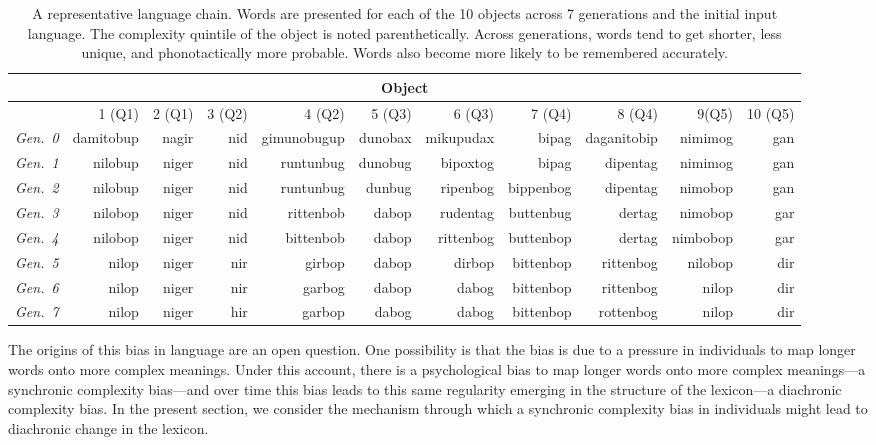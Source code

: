 \begin{table}[t]
 \scriptsize
\centering
\begin{tabular}{c rrrrrrrrrr}
\hline
 \multicolumn{11}{c}{Object} \\
 \hline

 \rule{0pt}{2ex}    
& 1 (Q1) & 2 (Q1) & 3 (Q2) & 4 (Q2) & 5 (Q3) & 6 (Q3) & 7 (Q4) & 8 (Q4) & 9(Q5) & 10 (Q5) \\ 
 \hline
    {\it Gen.\ 0} & damitobup & nagir & nid & gimunobugup & dunobax & mikupudax & bipag & daganitobip & nimimog & gan \\ 
   {\it Gen.\ 1}& nilobup & niger & nid & runtunbug & dunobug & bipoxtog & bipag & dipentag & nimimog & gan \\ 
    {\it Gen.\ 2} & nilobup & niger & nid & runtunbug & dunbug & ripenbog & bippenbog & dipentag & nimobop & gan \\ 
  {\it Gen.\ 3} & nilobop & niger & nid & rittenbob & dabop & rudentag & buttenbug & dertag & nimobop & gar \\ 
   {\it Gen.\ 4} & nilobop & niger & nid & bittenbob & dabop & rittenbog & buttenbop & dertag & nimbobop & gar \\ 
    {\it Gen.\ 5}  & nilop & niger & nir & girbop & dabop & dirbop & bittenbop & rittenbog & nilobop & dir \\ 
   {\it Gen.\ 6}& nilop & niger & nir & garbog & dabop & dabog & bittenbop & rittenbog & nilop & dir \\
   {\it Gen.\ 7}& nilop & niger & hir & garbop & dabog & dabog & bittenbop & rottenbog & nilop & dir \\ 
\hline
\end{tabular}
\caption{A representative language chain. Words are presented for each of the 10 objects across 7 generations and the initial input language. The complexity quintile of the object is noted parenthetically. Across generations, words tend to get shorter, less unique, and phonotactically more probable. Words also become more likely to be remembered accurately.}
\label{tab:ex}
\end{table}
\normalsize


The origins of this bias  in language are an open question. One possibility is that the bias is due to a pressure in individuals to map longer words onto more complex meanings. Under this account, there is a psychological bias to map longer words onto more complex meanings---a synchronic complexity bias---and over time this bias leads to this same regularity emerging in the structure of the lexicon---a diachronic complexity bias. In the present section, we consider the mechanism through which a synchronic complexity bias in individuals might lead to diachronic change in the lexicon.  

